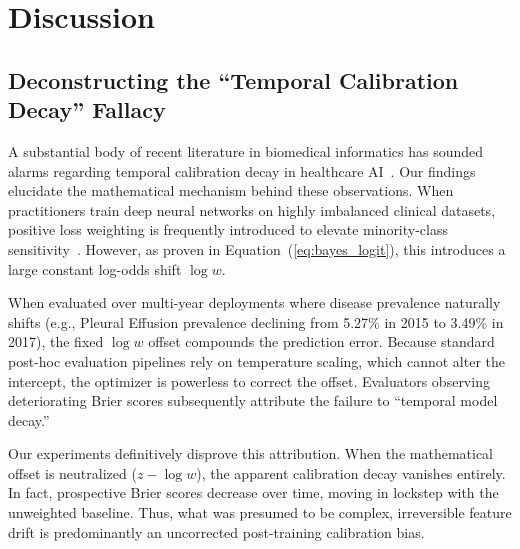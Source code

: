 \documentclass[journal]{IEEEtran}
\begin{document}
\section{Discussion}

\subsection{Deconstructing the ``Temporal Calibration Decay'' Fallacy}
A substantial body of recent literature in biomedical informatics has sounded alarms regarding temporal calibration decay in healthcare AI~\cite{guo2022evaluation, hinson2022multisite}. Our findings elucidate the mathematical mechanism behind these observations. When practitioners train deep neural networks on highly imbalanced clinical datasets, positive loss weighting is frequently introduced to elevate minority-class sensitivity~\cite{rajpurkar2017chexnet}. However, as proven in Equation~(\ref{eq:bayes_logit}), this introduces a large constant log-odds shift $\log w$.

When evaluated over multi-year deployments where disease prevalence naturally shifts (e.g., Pleural Effusion prevalence declining from 5.27\% in 2015 to 3.49\% in 2017), the fixed $\log w$ offset compounds the prediction error. Because standard post-hoc evaluation pipelines rely on temperature scaling, which cannot alter the intercept, the optimizer is powerless to correct the offset. Evaluators observing deteriorating Brier scores subsequently attribute the failure to ``temporal model decay.''

Our experiments definitively disprove this attribution. When the mathematical offset is neutralized ($z - \log w$), the apparent calibration decay vanishes entirely. In fact, prospective Brier scores decrease over time, moving in lockstep with the unweighted baseline. Thus, what was presumed to be complex, irreversible feature drift is predominantly an uncorrected post-training calibration bias.
\end{document}
